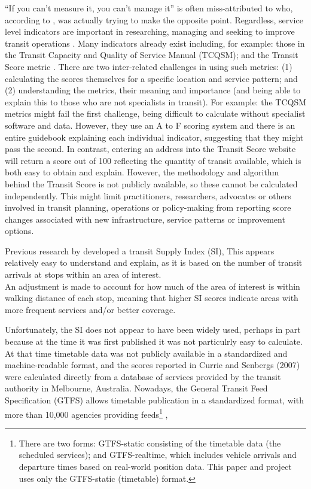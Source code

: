 \documentclass[preprint, 3p,
authoryear]{elsarticle} %
\begin{document}
``If you can't measure it, you can't manage it'' is often
miss-attributed to \citet{Deming1993new} who, according to
\citet{Berenson2016}, was actually trying to make the opposite point.
Regardless, service level indicators are important in researching,
managing and seeking to improve transit operations
\citep{FieldingGordonJ1987Mpts, Ryus:2003aa}. Many indicators already
exist including, for example: those in the Transit Capacity and Quality
of Service Manual (TCQSM)\citep{TCQSM:2013}; and the Transit Score
metric \citep{WalkScore:2023tg}. There are two inter-related challenges
in using such metrics: (1) calculating the scores themselves for a
specific location and service pattern; and (2) understanding the
metrics, their meaning and importance (and being able to explain this to
those who are not specialists in transit). For example: the TCQSM
metrics might fail the first challenge, being difficult to calculate
without specialist software and data. However, they use an A to F
scoring system and there is an entire guidebook explaining each
individual indicator, suggesting that they might pass the second. In
contrast, entering an address into the Transit Score website will return
a score out of 100 reflecting the quantity of transit available, which
is both easy to obtain and explain. However, the methodology and
algorithm behind the Transit Score is not publicly available, so these
cannot be calculated independently. This might limit practitioners,
researchers, advocates or others involved in transit planning,
operations or policy-making from reporting score changes associated with
new infrastructure, service patterns or improvement options.

Previous research by \citet{currie2007identifying} developed a transit
Supply Index (SI), This appears relatively easy to understand and
explain, as it is based on the number of transit arrivals at stops
within an area of interest.\\
An adjustment is made to account for how much of the area of interest is
within walking distance of each stop, meaning that higher SI scores
indicate areas with more frequent services and/or better coverage.

Unfortunately, the SI does not appear to have been widely used, perhaps
in part because at the time it was first published it was not
particulrly easy to calculate. At that time timetable data was not
publicly available in a standardized and machine-readable format, and
the scores reported in Currie and Senbergs (2007) were calculated
directly from a database of services provided by the transit authority
in Melbourne, Australia. Nowadays, the General Transit Feed
Specification (GTFS) allows timetable publication in a standardized
format, with more than 10,000 agencies providing feeds\footnote{There
  are two forms: GTFS-static consisting of the timetable data (the
  scheduled services); and GTFS-realtime, which includes vehicle
  arrivals and departure times based on real-world position data. This
  paper and project uses only the GTFS-static (timetable) format.}
\citep{GTFS},
\end{document}
